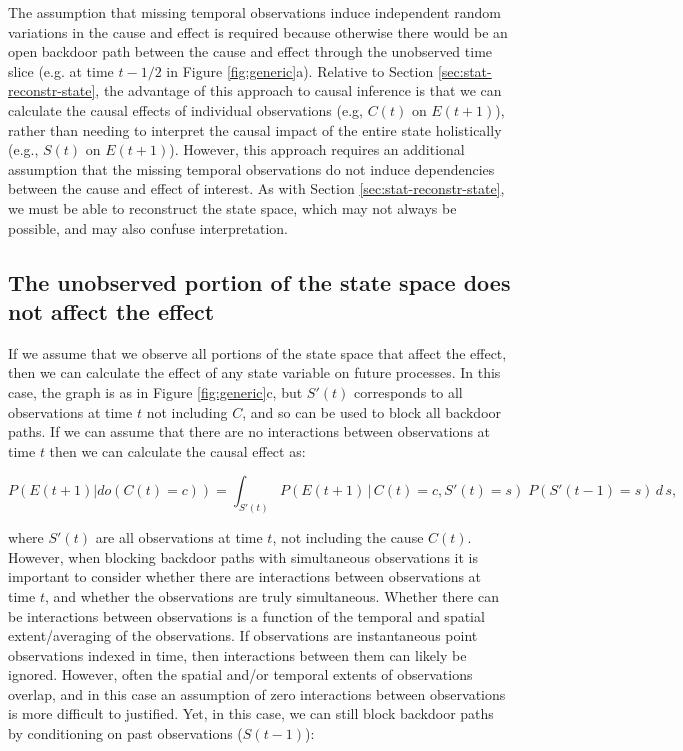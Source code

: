 \documentclass[12pt]{article}
\begin{document}
The assumption that missing temporal observations induce independent
random variations in the cause and effect is required because
otherwise there would be an open backdoor path between the cause and
effect through the unobserved time slice (e.g. at time $t-1/2$ in
Figure \ref{fig:generic}a). Relative to Section
\ref{sec:stat-reconstr-state}, the advantage of this approach to
causal inference is that we can calculate the causal effects of
individual observations (e.g, $C(t)$ on $E(t+1)$), rather than needing
to interpret the causal impact of the entire state holistically (e.g.,
$S(t)$ on $E(t+1)$). However, this approach requires an additional
assumption that the missing temporal observations do not induce
dependencies between the cause and effect of interest. As with Section
\ref{sec:stat-reconstr-state}, we must be able to reconstruct the
state space, which may not always be possible, and may also confuse
interpretation.


\subsection{The unobserved portion of the state space does not affect
  the effect}
\label{sec:observ-port-state}

If we assume that we observe all portions of the state space that
affect the effect, then we can calculate the effect of any state
variable on future processes. In this case, the graph is as in Figure
\ref{fig:generic}c, but $S'(t)$ corresponds to all observations at
time $t$ not including $C$, and so can be used to block all backdoor
paths. If we can assume that there are no interactions between
observations at time $t$ then we can calculate the causal effect as:

\begin{equation} P(E(t+1)| do(C(t)=c)) = \int_{S'(t)} P(E(t+1) \, | \,
  C(t)=c, S'(t) = s )\; P(S'(t-1)=s) \, d \, s,
\end{equation}

where $S'(t)$ are all observations at time $t$, not including the
cause $C(t)$. However, when blocking backdoor paths with simultaneous
observations it is important to consider whether there are
interactions between observations at time $t$, and whether the
observations are truly simultaneous. Whether there can be interactions
between observations is a function of the temporal and spatial
extent/averaging of the observations. If observations are
instantaneous point observations indexed in time, then interactions
between them can likely be ignored. However, often the spatial and/or
temporal extents of observations overlap, and in this case an
assumption of zero interactions between observations is more difficult
to justified. Yet, in this case, we can still block backdoor paths by
conditioning on past observations ($S(t-1)$):
\end{document}
